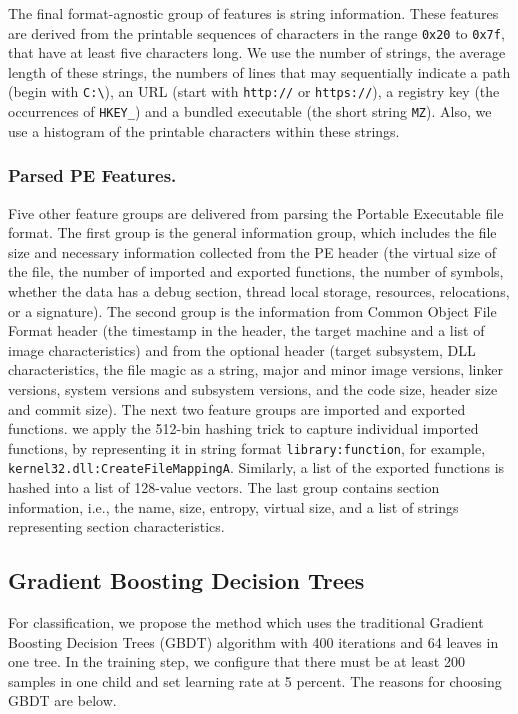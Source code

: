 \documentclass[runningheads]{llncs}
\begin{document}
The final format-agnostic group of features is string information. These features are derived from the printable sequences of characters in the range \verb|0x20| to \verb|0x7f|, that have at least five characters long. We use the number of strings, the average length of these strings, the numbers of lines that may sequentially indicate a path (begin with \verb|C:\|), an URL (start with \verb|http://| or \verb|https://|), a registry key (the occurrences of \verb|HKEY_|) and a bundled executable (the short string \verb|MZ|). Also, we use a histogram of the printable characters within these strings.

\subsubsection{Parsed PE Features.}

Five other feature groups are delivered from parsing the Portable Executable file format. The first group is the general information group, which includes the file size and necessary information collected from the PE header (the virtual size of the file, the number of imported and exported functions, the number of symbols, whether the data has a debug section, thread local storage, resources, relocations, or a signature). The second group is the information from Common Object File Format header (the timestamp in the header, the target machine and a list of image characteristics) and from the optional header (target subsystem, DLL characteristics,  the file magic as a string, major and minor image versions, linker versions, system versions and subsystem versions, and the code size, header size and commit size). The next two feature groups are imported and exported functions. we apply the 512-bin hashing trick to capture individual imported functions, by representing it in string format \verb|library:function|, for example, \verb|kernel32.dll:CreateFileMappingA|. Similarly, a list of the exported functions is hashed into a list of 128-value vectors. The last group contains section information, i.e., the name, size, entropy, virtual size, and a list of strings representing section characteristics.

\subsection{Gradient Boosting Decision Trees}

For classification, we propose the method which uses the traditional Gradient Boosting Decision Trees (GBDT) algorithm with 400 iterations and 64 leaves in one tree. In the training step, we configure that there must be at least 200 samples in one child and set learning rate at 5 percent. The reasons for choosing GBDT are below.
\end{document}
